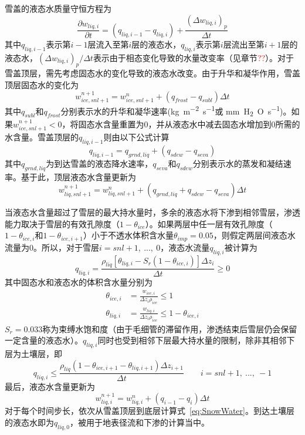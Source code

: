 雪盖的液态水质量守恒方程为
\begin{equation}
    \frac{\partial w_{liq,i}}{\partial t}=\left(q_{liq,i-1}-q_{liq,i}\right)+\frac{{\left(\Delta w_{liq,i}\right)}_p}{\Delta t}
\end{equation}
其中$q_{liq,i-1}$表示第$i-1$层流入至第$i$层的液态水，$q_{liq,i}$表示第$i$层流出至第$i+1$层的液态水，${{\left(\Delta w_{liq,i}\right)}_p}/{\Delta t}$表示由于相态变化导致的水量改变率（见章节\textcolor{red}{??}）。对于雪盖顶层，需先考虑固态水的变化导致的液态水改变。由于升华和凝华作用，雪盖顶层固态水的变化为
\begin{equation}
    w_{ice,snl+1}^{n+1}=w_{ice,snl+1}^n+\left(q_{frost}-q_{subl}\right)\Delta t
\end{equation}
其中$q_{subl}$和$q_{frost}$分别表示水的升华和凝华速率(\unit{kg.m^{-2}.s^{-1}}或 \unit{mm.H_2O.s^{-1}})。如果$w_{ice,snl+1}^{n+1}<0$，将固态水含量重置为0，并从液态水中减去固态水增加到0所需的水含量。雪盖顶层的$q_{liq,i-1}$则由以下公式计算
\begin{equation}
    q_{liq,i-1}=q_{grnd,liq}+\left(q_{sdew}-q_{seva}\right)
\end{equation}
其中$q_{grnd,liq}$为到达雪盖的液态降水速率，$q_{seva}$和$q_{sdew}$分别表示水的蒸发和凝结速率。基于此，顶层液态水含量更新为
\begin{equation}w_{liq,snl+1}^{n+1}=w_{liq,snl+1}^n+\left(q_{grnd,liq}+q_{sdew}-q_{seva}\right)\Delta t
\end{equation}

当液态水含量超过了雪层的最大持水量时，多余的液态水将下渗到相邻雪层，渗透能力取决于雪层的有效孔隙度（$1-\theta_{ice}$）。如果两层中任一层有效孔隙度（$1-\theta_{ice,i}$和$1-\theta_{ice,i+1}$）小于不透水体积含水量$\theta_{imp}=0.05$，则假定两层间液态水流量为0。所以，对于雪层$i=snl+1,\ ...,\ 0$，液态水流量$q_{liq,i}$被计算为
\begin{equation}
    q_{liq,i}=\frac{\rho_{liq}\left[\theta_{liq,i}-S_r\left(1-\theta_{ice,i}\right)\right]\Delta z_i}{\Delta t}\geqslant 0
\end{equation}
其中固态水和液态水的体积含水量分别为
\begin{align}
    \theta_{ice,i}&=\frac{w_{ice,i}}{\Delta z_i \rho_{ice}} \leqslant 1 \\
    \theta_{liq,i}&=\frac{w_{liq,i}}{\Delta z_i \rho_{ice}} \leqslant 1-\theta_{ice,i}
\end{align}
$S_r=0.033$称为束缚水饱和度（由于毛细管的滞留作用，渗透结束后雪层仍会保留一定含量的液态水）。$q_{liq,i}$同时也受到相邻下层最大持水量的限制，除非其相邻下层为土壤层，即
\begin{equation}
    q_{liq,i} \leqslant \frac{\rho_{liq}\left(1-\theta_{ice,i+1}-\theta_{liq,i+1}\right)\Delta z_{i+1}}{\Delta t} \qquad i=snl+1,\ ...,\ -1
\end{equation}
最后，液态水含量更新为
\begin{equation}\label{eq:SnowWater}
    w_{liq,i}^{n+1}=w_{liq,i}^n+\left(q_{i-1}-q_i\right)\Delta t
\end{equation}
对于每个时间步长，依次从雪盖顶层到底层计算式~\eqref{eq:SnowWater}。到达土壤层的液态水即为$q_{liq,0}$，被用于地表径流和下渗的计算当中。

